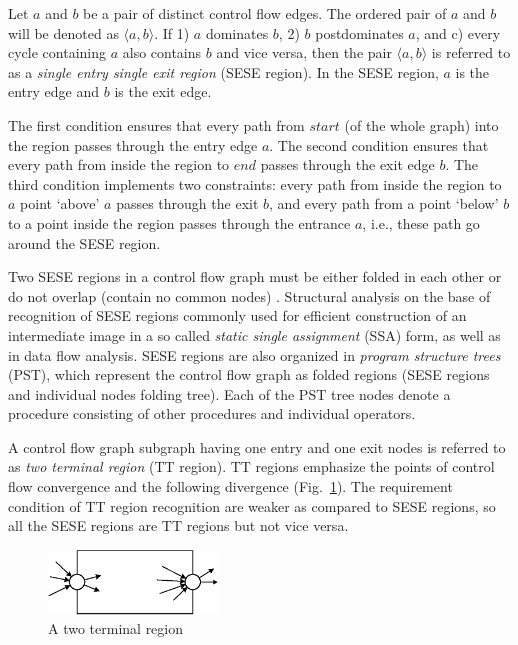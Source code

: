 \documentclass[conference]{IEEEtran}
\begin{document}
Let $a$ and $b$ be a pair of distinct control flow edges.  The ordered pair of $a$ and $b$ will be denoted as $\langle a,b \rangle$.  If 1) $a$ dominates $b$, 2) $b$ postdominates $a$, and c) every cycle containing $a$ also contains $b$ and vice versa, then the pair $\langle a,b \rangle$ is referred to as a \emph{single entry single exit region} (SESE region).  In the SESE region, $a$ is the entry edge and $b$ is the exit edge.

The first condition ensures that every path from $start$ (of the whole graph) into the region passes through the entry edge $a$.  The second condition ensures that every path from inside the region to $end$ passes through the exit edge $b$.  The third condition implements two constraints: every path from inside the region to $a$ point ‘above’ $a$ passes through the exit $b$, and every path from a point ‘below’ $b$ to a point inside the region passes through the entrance $a$, i.e., these path go around the SESE region.

Two SESE regions in a control flow graph must be either folded in each other or do not overlap (contain no common nodes) \cite{sese}.  Structural analysis on the base of recognition of SESE regions commonly used for efficient construction of an intermediate image in a so called \emph{static single assignment} (SSA) form, as well as in data flow analysis.  SESE regions are also organized in \emph{program structure trees} (PST), which represent the control flow graph as folded regions (SESE regions and individual nodes folding tree).  Each of the PST tree nodes denote a procedure consisting of other procedures and individual operators.

A control flow graph subgraph having one entry and one exit nodes is referred to as \emph{two terminal region} (TT region).  TT regions emphasize the points of control flow convergence and the following divergence (Fig.~\ref{fig:TTRegion}).  The requirement condition of TT region recognition are weaker as compared to SESE regions, so all the SESE regions are TT regions but not vice versa.
\begin{figure}[tb]
	\centering
		\includegraphics[width=0.4\textwidth]{Pic/TTRegion.eps}
	\caption{A two terminal region}
	\label{fig:TTRegion}
\end{figure}
\end{document}
